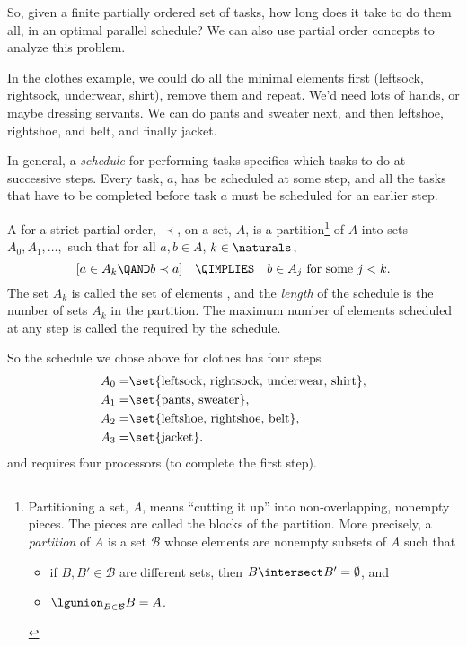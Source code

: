 So, given a finite partially ordered set of tasks, how long does it take
to do them all, in an optimal parallel schedule?  We can also use partial
order concepts to analyze this problem.

In the clothes example, we could do all the minimal elements first
(leftsock, rightsock, underwear, shirt), remove them and repeat.  We'd need
lots of hands, or maybe dressing servants.  We can do pants and sweater
next, and then leftshoe, rightshoe, and belt, and finally jacket.

In general, a \emph{schedule} for performing tasks specifies which
tasks to do at successive steps.  Every task, $a$, has be scheduled at
some step, and all the tasks that have to be completed before task $a$
must be scheduled for an earlier step.

\begin{definition}\label{def:schedule}
A  for a strict partial order, $\prec$, on a set,
$A$, is a partition\footnote{Partitioning a set,
$A$, means ``cutting it up'' into non-overlapping, nonempty pieces.  The
pieces are called the blocks of the partition.  More precisely, a
\emph{partition} of $A$ is a set $\mathcal{B}$ whose elements are nonempty
subsets of $A$ such that
\begin{itemize}
\item if $B,B' \in \mathcal{B}$ are different sets, then $B \intersect B' =
 \emptyset$, and
\item $\lgunion_{B\in \mathcal{B}} B = A$.
\end{itemize}} of $A$ into sets $A_0, A_1,\dots,$ such
that for all $a,b \in A$, $k \in \naturals$,
\[
[a \in A_k \QAND b \prec a] \quad\QIMPLIES\quad b \in A_j \text{ for some } j < k.
\]
The set $A_k$ is called the set of
elements , and the \emph{length} of the
schedule is the number of sets $A_k$ in the partition.  The maximum
number of elements scheduled at any step is called the  required by the schedule.
\end{definition}

So the schedule we chose above for clothes has four steps
\begin{align*}
A_0 = & \set{\text{leftsock, rightsock, underwear, shirt}},\\
A_1 = & \set{\text{pants, sweater}},\\
A_2 = & \set{\text{leftshoe, rightshoe, belt}},\\
A_3 = & \set{\text{jacket}}.
\end{align*}
and requires four processors (to complete the first step).

